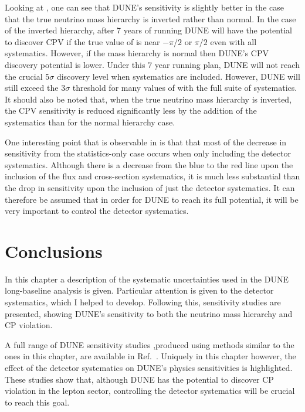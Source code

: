 Looking at , one can see that DUNE's sensitivity is slightly better in the case that the true neutrino mass hierarchy is inverted rather than normal.
In the case of the inverted hierarchy, after 7 years of running DUNE will have the potential to discover CPV if the true value of \dcp is near $-\pi/2$ or $\pi/2$ even with all systematics.
However, if the mass hierarchy is normal then DUNE's CPV discovery potential is lower. 
Under this 7 year running plan, DUNE will not reach the crucial $5\sigma$ discovery level when systematics are included. 
However, DUNE will still exceed the $3\sigma$ threshold for many values of \dcp with the full suite of systematics.
It should also be noted that, when the true neutrino mass hierarchy is inverted, the CPV sensitivity is reduced significantly less by the addition of the systematics than for the normal hierarchy case.

One interesting point that is observable in  is that that most of the decrease in sensitivity from the statistics-only case occurs when only including the detector systematics.
Although there is a decrease from the blue to the red line upon the inclusion of the flux and cross-section systematics, it is much less substantial than the drop in sensitivity upon the inclusion of just the detector systematics.
It can therefore be assumed that in order for DUNE to reach its full potential, it will be very important to control the detector systematics.

\section{Conclusions}
\label{sec:dune_lbl:conclusion}

In this chapter a description of the systematic uncertainties used in the DUNE long-baseline analysis is given. 
Particular attention is given to the detector systematics, which I helped to develop.
Following this, sensitivity studies are presented, showing DUNE's sensitivity to both the neutrino mass hierarchy and CP violation.

A full range of DUNE sensitivity studies ,produced using methods similar to the ones in this chapter, are available in Ref.~\cite{Abi:2020qib}.
Uniquely in this chapter however, the effect of the detector systematics on DUNE's physics sensitivities is highlighted.
These studies show that, although DUNE has the potential to discover CP violation in the lepton sector, controlling the detector systematics will be crucial to reach this goal.

